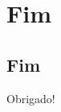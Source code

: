 \documentclass{beamer}
\begin{document}
\section{Fim}
\subsection{Fim}
\begin{frame}
\Huge{\centerline{Obrigado!}}
\end{frame}

\end{document}
